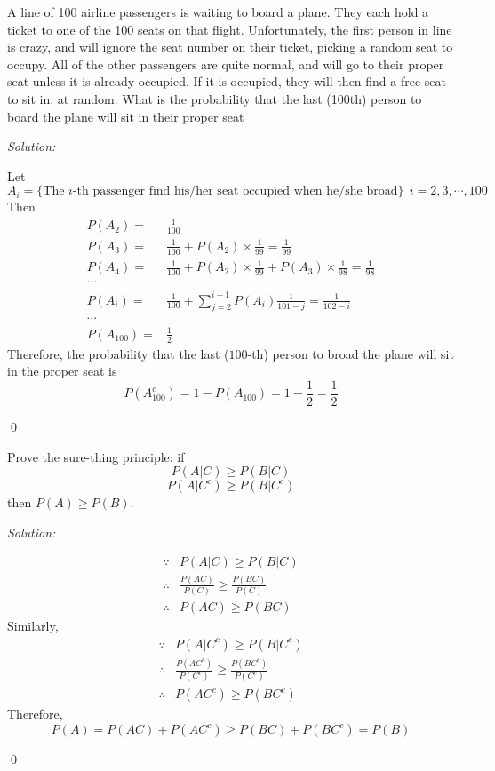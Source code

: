 \documentclass[12pt]{article}
\newenvironment{problem}[2][Problem]{\begin{trivlist}
\item[\hskip \labelsep {\bfseries #1}\hskip \labelsep {\bfseries #2.}]}{\end{trivlist}}
\newenvironment{sol}
    {\emph{Solution:}
    }
    {
    \qed
    }
\begin{document}
\begin{problem}{3}
A line of 100 airline passengers is waiting to board a plane. They each hold a ticket to one of the 100 seats on that flight. Unfortunately, the first person in line is crazy, and will ignore the seat number on their ticket, picking a random seat to occupy. All of the other passengers are quite normal, and will go to their proper seat unless it is already occupied. If it is occupied, they will then find a free seat to sit in, at random. What is the probability that the last (100th) person to board the plane will sit in their proper seat
\end{problem}
\begin{sol}
Let
\[
A_i=\{\text{The }i\text{-th passenger find his/her seat occupied when he/she broad}\}~~i=2,3,\cdots,100
\]
Then
\begin{align*}
P(A_2)=&\frac{1}{100}\\
P(A_3)=&\frac{1}{100}+P(A_2)\times\frac{1}{99}=\frac{1}{99}\\
P(A_4)=&\frac{1}{100}+P(A_2)\times\frac{1}{99}+P(A_3)\times\frac{1}{98}=\frac{1}{98}\\
\cdots&\\
P(A_i)=&\frac{1}{100}+\sum_{j=2}^{i-1}P(A_i)\frac{1}{101-j}=\frac{1}{102-i}\\
\cdots&\\
P(A_{100})=&\frac{1}{2}
\end{align*}
Therefore, the probability that the last ($100$-th) person to broad the plane will sit in the proper seat is
\[
P(A_{100}^c)=1-P(A_{100})=1-\frac{1}{2}=\frac{1}{2}
\]
\end{sol}







\begin{problem}{4}
Prove the sure-thing principle: if
$$P(A|C) \geq P(B|C)$$
$$P(A|C^{c}) \geq P(B|C^{c})$$
then $P (A) \geq P (B)$.
\end{problem}
\begin{sol}
\begin{align*}
\because&P(A|C)\geq P(B|C)\\
\therefore&\frac{P(AC)}{P(C)}\geq\frac{P(BC)}{P(C)}\\
\therefore&P(AC)\geq P(BC)
\end{align*}
Similarly,
\begin{align*}
\because&P(A|C^c)\geq P(B|C^c)\\
\therefore&\frac{P(AC^c)}{P(C^c)}\geq\frac{P(BC^c)}{P(C^c)}\\
\therefore&P(AC^c)\geq P(BC^c)
\end{align*}
Therefore,
\[
P(A)=P(AC)+P(AC^c)\geq P(BC)+P(BC^c)=P(B)
\]
\end{sol}
\end{document}
